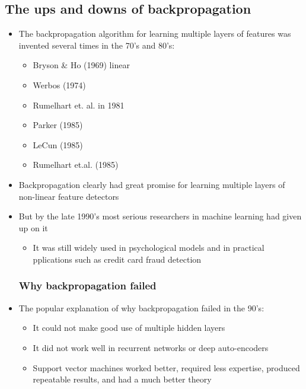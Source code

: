 \subsection{The ups and downs of backpropagation}
\begin{itemize}
	\subsubsection{A brief history of backpropagation}
	\item The backpropagation algorithm for learning multiple layers of features was invented several times in the 70's and 80's:
	\begin{itemize}
		\item Bryson \& Ho (1969) linear
		\item Werbos (1974)
		\item Rumelhart et. al. in 1981
		\item Parker (1985)
		\item LeCun (1985)
		\item Rumelhart et.al. (1985)
	\end{itemize}

	\item Backpropagation clearly had great promise for learning multiple layers of non-linear feature detectors
	\item But by the late 1990's most serious researchers in machine learning had given up on it
	\begin{itemize}
		\item It was still widely used in psychological models and in practical pplications such as credit card fraud detection
	\end{itemize}

	\subsubsection{Why backpropagation failed}
	\item The popular explanation of why backpropagation failed in the 90's:
	\begin{itemize}
		\item It could not make good use of multiple hidden layers
		\item It did not work well in recurrent networks or deep auto-encoders
		\item Support vector machines worked better, required less expertise, produced repeatable results, and had a much better theory
	\end{itemize}


\end{itemize}
